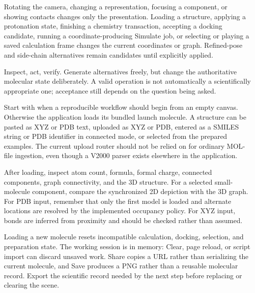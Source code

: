 \documentclass[11pt]{article}
\begin{document}
Rotating the camera, changing a representation, focusing a component, or showing contacts changes only the presentation. Loading a structure, applying a protonation state, finishing a chemistry transaction, accepting a docking candidate, running a coordinate-producing Simulate job, or selecting or playing a saved calculation frame changes the current coordinates or graph. Refined-pose and side-chain alternatives remain candidates until explicitly applied.

Inspect, act, verify. Generate alternatives freely, but change the authoritative molecular state deliberately. A valid operation is not automatically a scientifically appropriate one; acceptance still depends on the question being asked.


Start with  when a reproducible workflow should begin from an empty canvas. Otherwise the application loads its bundled launch molecule. A structure can be pasted as XYZ or PDB text, uploaded as XYZ or PDB, entered as a SMILES string or PDB identifier in connected mode, or selected from the prepared examples. The current upload router should not be relied on for ordinary MOL-file ingestion, even though a V2000 parser exists elsewhere in the application.

After loading, inspect atom count, formula, formal charge, connected components, graph connectivity, and the 3D structure. For a selected small-molecule component, compare the synchronized 2D depiction with the 3D graph. For PDB input, remember that only the first model is loaded and alternate locations are resolved by the implemented occupancy policy. For XYZ input, bonds are inferred from proximity and should be checked rather than assumed.


Loading a new molecule resets incompatible calculation, docking, selection, and preparation state. The working session is in memory: Clear, page reload, or script import can discard unsaved work. Share copies a URL rather than serializing the current molecule, and Save produces a PNG rather than a reusable molecular record. Export the scientific record needed by the next step before replacing or clearing the scene.
\end{document}
